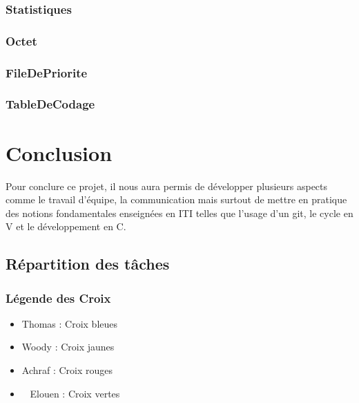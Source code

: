 \documentclass{article}
\begin{document}
\subsubsection{\textbf{Statistiques}}


\subsubsection{\textbf{Octet}}


\subsubsection{\textbf{FileDePriorite}}


\subsubsection{\textbf{TableDeCodage}}




\newpage


\section{Conclusion}


Pour conclure ce projet, il nous aura permis de développer plusieurs aspects comme le travail d'équipe, la communication mais surtout de mettre en pratique des notions fondamentales enseignées en ITI telles que l'usage d'un git, le cycle en V et le développement en C. 

\subsection{Répartition des tâches}

\subsubsection{Légende des Croix}

\begin{itemize}
  \item \textcolor{blue}{} Thomas : Croix bleues 
  \item \textcolor{yellow}{} Woody : Croix jaunes
  \item \textcolor{red}{} Achraf : Croix rouges
  \item \ \textcolor{green}{} Elouen : Croix vertes
\end{itemize}
\end{document}

